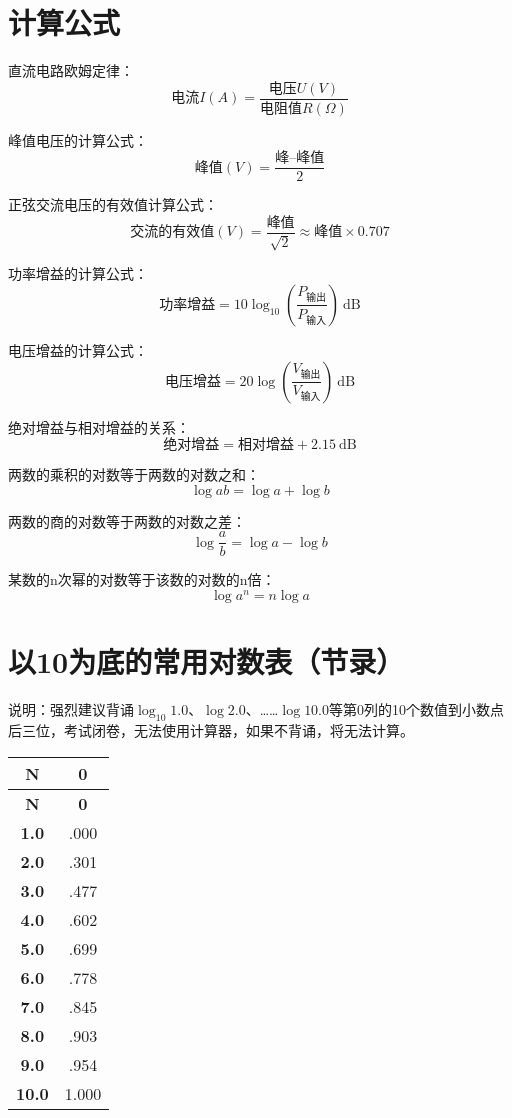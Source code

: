 \newpage





\section{计算公式}

直流电路欧姆定律：
\[\mbox{电流}I(A)=\frac{\mbox{电压}U(V)}{\mbox{电阻值}R(\Omega)}\]

峰值电压的计算公式：
\[\mbox{峰值}(V)=\frac{\mbox{峰--峰值}}{2}\]

正弦交流电压的有效值计算公式：
\[\mbox{交流的有效值}(V)=\frac{\mbox{峰值}}{\sqrt{2}} \approx \mbox{峰值}\times0.707\]

功率增益的计算公式：
\[\mbox{功率增益}=10 \log_{10} \left( {\frac{P_{ \mbox{输出} }}{P_{ \mbox{输入} }}}\right)\ \mathrm{dB}\]

电压增益的计算公式：
\[\mbox{电压增益}=20 \log \left( {\frac{V_{ \mbox{输出} }}{V_{ \mbox{输入} }}} \right)\ \mathrm{dB}\]


绝对增益与相对增益的关系：
\[\mbox{绝对增益} = \mbox{相对增益} + 2.15 \ \mathrm{dB}\]

两数的乘积的对数等于两数的对数之和：
\[\log ab=\log a+\log b\]

两数的商的对数等于两数的对数之差：
\[\log\frac{a}{b}=\log a-\log b\]

某数的n次幂的对数等于该数的对数的n倍：
\[\log a^n =n\log a\]

\newpage


\section{以10为底的常用对数表（节录）}

说明：强烈建议背诵$\log_{10} 1.0$、$\log 2.0$、……$\log 10.0$等第0列的10个数值到小数点后三位，考试闭卷，无法使用计算器，如果不背诵，将无法计算。

\begin{longtable}[c]{|c|c|}
    \hline
    \textbf{N} & \textbf{0} \\
    \hline
    \endfirsthead
    \hline
    \textbf{N} & \textbf{0} \\
    \endhead
    \textbf{1.0} & .000 \\ \hline
    \textbf{2.0} & .301 \\ \hline
    \textbf{3.0} & .477 \\ \hline
    \textbf{4.0} & .602 \\ \hline
    \textbf{5.0} & .699 \\ \hline
    \textbf{6.0} & .778 \\ \hline
    \textbf{7.0} & .845 \\ \hline
    \textbf{8.0} & .903 \\ \hline
    \textbf{9.0} & .954 \\ \hline
    \textbf{10.0} & 1.000 \\ \hline
\end{longtable}

